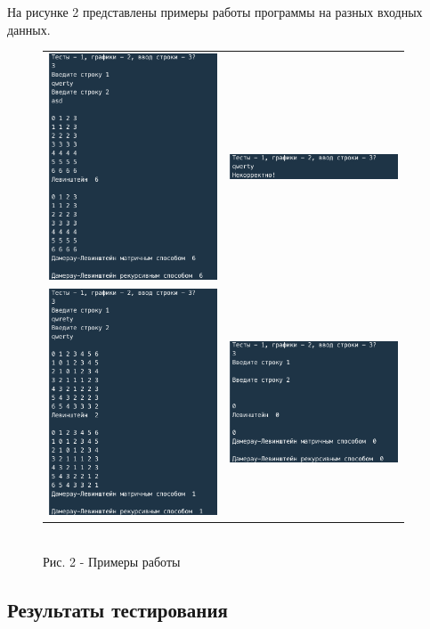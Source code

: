 \documentclass[a4paper,14pt]{article} %
\begin{document}
	На рисунке 2 представлены примеры работы программы на разных входных данных. 
	\begin{figure}[ht]\center
		\begin{tabular}{cc}
			\includegraphics[width=50mm]{ex1} & \includegraphics[width=50mm]{ex2} \\
			\includegraphics[width=50mm]{ex3} & \includegraphics[width=50mm]{ex4}
		\end{tabular}
		\\ Рис. 2 - Примеры работы
	\end{figure}
        
        \subsection{Результаты тестирования}
        
\end{document}

